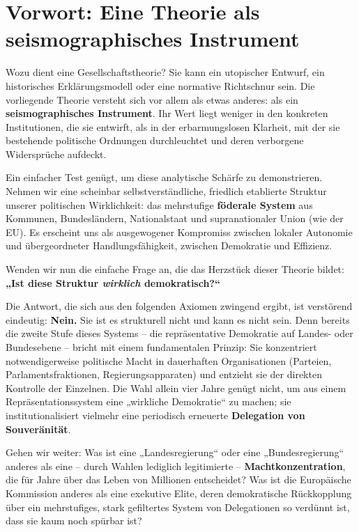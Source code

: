 
\chapter*{Vorwort: Eine Theorie als seismographisches Instrument}
\label{chap:vorwort}

\thispagestyle{empty}

Wozu dient eine Gesellschaftstheorie? Sie kann ein utopischer Entwurf, ein historisches Erklärungsmodell oder eine normative Richtschnur sein. Die
vorliegende Theorie versteht sich vor allem als etwas anderes: als ein \textbf{seismographisches Instrument}. Ihr Wert liegt weniger in den
konkreten Institutionen, die sie entwirft, als in der erbarmungslosen Klarheit, mit der sie bestehende politische Ordnungen durchleuchtet und deren
verborgene Widersprüche aufdeckt.

Ein einfacher Test genügt, um diese analytische Schärfe zu demonstrieren. Nehmen wir eine scheinbar selbstverständliche, friedlich etablierte
Struktur unserer politischen Wirklichkeit: das mehrstufige \textbf{föderale System} aus Kommunen, Bundesländern, Nationalstaat und supranationaler
Union (wie der EU). Es erscheint uns als ausgewogener Kompromiss zwischen lokaler Autonomie und übergeordneter Handlungsfähigkeit, zwischen
Demokratie und Effizienz.

Wenden wir nun die einfache Frage an, die das Herzstück dieser Theorie bildet: \textbf{„Ist diese Struktur \emph{wirklich} demokratisch?“}

Die Antwort, die sich aus den folgenden Axiomen zwingend ergibt, ist verstörend eindeutig: \textbf{Nein.} Sie ist es strukturell nicht und kann es
nicht sein. Denn bereits die zweite Stufe dieses Systems – die repräsentative Demokratie auf Landes- oder Bundesebene – bricht mit einem
fundamentalen Prinzip: Sie konzentriert notwendigerweise politische Macht in dauerhaften Organisationen (Parteien, Parlamentsfraktionen,
Regierungsapparaten) und entzieht sie der direkten Kontrolle der Einzelnen. Die Wahl allein vier Jahre genügt nicht, um aus einem
Repräsentationssystem eine „wirkliche Demokratie“ zu machen; sie institutionalisiert vielmehr eine periodisch erneuerte
\textbf{Delegation von Souveränität}.

Gehen wir weiter: Was ist eine „Landesregierung“ oder eine „Bundesregierung“ anderes als eine – durch Wahlen lediglich legitimierte –
\textbf{Machtkonzentration}, die für Jahre über das Leben von Millionen entscheidet? Was ist die Europäische Kommission anderes als eine exekutive
Elite, deren demokratische Rückkopplung über ein mehrstufiges, stark gefiltertes System von Delegationen so verdünnt ist, dass sie kaum noch spürbar
ist?

